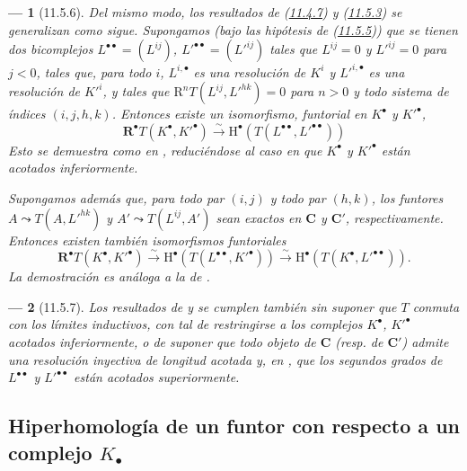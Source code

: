 \documentclass[10pt,oneside,openany]{book}
\theoremstyle{egaenv}\newtheorem*{env}{---}
\theoremstyle{egastatement}
\theoremstyle{egadescription}
\begin{document}
\begin{env}[11.5.6]
\label{0.11.5.6-fr}
Del mismo modo, los resultados de (\hyperref[0.11.4.7-fr]{11.4.7}) y (\hyperref[0.11.5.3-fr]{11.5.3}) se generalizan como sigue. Supongamos (bajo las hipótesis de (\hyperref[0.11.5.5-fr]{11.5.5})) que se tienen dos bicomplejos $L^{\bullet\bullet}=(L^{ij})$, $L'^{\bullet\bullet}=(L'^{ij})$ tales que $L^{ij}=0$ y $L'^{ij}=0$ para $j<0$, tales que, para todo $i$, $L^{i,\bullet}$ es una resolución de $K^i$ y $L'^{i,\bullet}$ es una resolución de $K'^i$, y tales que
$\mathrm R^nT(L^{ij},L'^{hk})=0$
para $n>0$ y todo sistema de índices $(i,j,h,k)$.
Entonces existe un isomorfismo, funtorial en $K^\bullet$ y $K'^\bullet$,
\[
  \label{0.11.5.6.1-fr}
  \mathbf R^\bullet T(K^\bullet,K'^\bullet)\xrightarrow{\sim}
  \mathrm H^\bullet(T(L^{\bullet\bullet},L'^{\bullet\bullet}))
  \tag{11.5.6.1}
\]
Esto se demuestra como en , reduciéndose al caso en que $K^\bullet$ y $K'^\bullet$ están acotados inferiormente.

Supongamos además que, para todo par $(i,j)$ y todo par $(h,k)$, los funtores $A\leadsto T(A,L'^{hk})$ y $A'\leadsto T(L^{ij},A')$ sean exactos en $\boldsymbol{C}$ y $\boldsymbol{C}'$, respectivamente.
Entonces existen también isomorfismos funtoriales
\[
  \label{0.11.5.6.2-fr}
  \mathbf R^\bullet T(K^\bullet,K'^\bullet)
  \xrightarrow{\sim}\mathrm H^\bullet(T(L^{\bullet\bullet},K'^\bullet))
  \xrightarrow{\sim}\mathrm H^\bullet(T(K^\bullet,L'^{\bullet\bullet})).
  \tag{11.5.6.2}
\]
La demostración es análoga a la de .
\end{env}

\begin{env}[11.5.7]
\label{0.11.5.7}
\label{0.11.5.7-fr}
Los resultados de  y  se cumplen también sin suponer que $T$ conmuta con los límites inductivos, con tal de restringirse a los complejos $K^\bullet$, $K'^\bullet$ acotados inferiormente, o de suponer que todo objeto de $\boldsymbol{C}$ (resp. de $\boldsymbol{C}'$) admite una resolución inyectiva de longitud acotada y, en , que los segundos grados de $L^{\bullet\bullet}$ y $L'^{\bullet\bullet}$ están acotados superiormente.
\end{env}

\subsection{Hiperhomología de un funtor con respecto a un complejo $K_\bullet$}
\label{subsection:0.11.6}
\label{subsection:0.11.6-fr}
\end{document}

